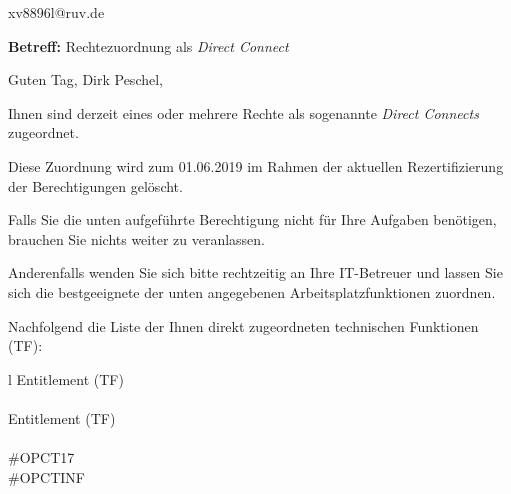\documentclass[a4paper,landscape,12pt]{letter}
\begin{document}
\begin{letter}{xv8896l@ruv.de\hfill \break}
\begin{normalsize}
	\opening{\textbf{Betreff:} Rechtezuordnung als \emph{Direct Connect}}
	\begin{normalsize} \hfill
	\end{normalsize}

	\begin{normalsize}
		Guten Tag, 
	Dirk Peschel, \hfill \break
	\end{normalsize}
	\end{normalsize}
	
\begin{normalsize}
	Ihnen sind derzeit eines oder mehrere Rechte als sogenannte \emph{Direct Connects} zugeordnet.
	
	Diese Zuordnung wird zum 01.06.2019 im Rahmen der aktuellen Rezertifizierung der Berechtigungen gelöscht.
	
	Falls Sie die unten aufgeführte Berechtigung nicht für Ihre Aufgaben benötigen, 
	brauchen Sie nichts weiter zu veranlassen.
	
	Anderenfalls wenden Sie sich bitte rechtzeitig an Ihre IT-Betreuer 
	und lassen Sie sich die bestgeeignete der unten angegebenen Arbeitsplatzfunktionen zuordnen.
	\end{normalsize}
	
\begin{normalsize}
	Nachfolgend die Liste der Ihnen direkt zugeordneten technischen Funktionen (TF):

	\begin{longtable}{l}
		Entitlement (TF) \\ \hline
		\endfirsthead
		\\\hline
		Entitlement (TF) \\ \hline
		\endhead %
		\multicolumn{1}{r@{}}{Fortsetzung \ldots}\\
		\endfoot
		\hline
		\endlastfoot
	\#OPCT17\\\#OPCTINF\\
	\end{longtable}
	\end{normalsize}
	

\end{letter}
\end{document}
